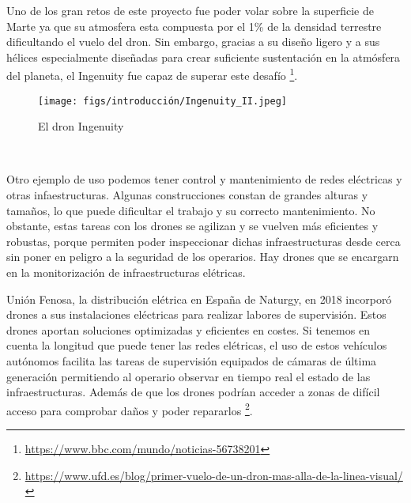 Uno de los gran retos de este proyecto fue poder volar sobre la superficie de Marte ya que su atmosfera esta compuesta por el 1\% de la densidad terrestre
dificultando el vuelo del dron. Sin embargo, gracias a su diseño ligero y a sus hélices especialmente diseñadas para crear suficiente sustentación en la atmósfera del planeta, el Ingenuity 
fue capaz de superar este desafío \footnote{\url{https://www.bbc.com/mundo/noticias-56738201}}. \newline
\begin{figure} [H]
  \begin{center}
    \texttt{[image: figs/introducción/Ingenuity\_II.jpeg]}
  \end{center}
  \caption{El dron Ingenuity}
  \label{fig:Ingenuity}
\end{figure}\

Otro ejemplo de uso podemos tener control y mantenimiento de redes eléctricas y otras infaestructuras. Algunas construcciones constan de grandes alturas y tamaños, lo que puede
dificultar el trabajo y su correcto mantenimiento. No obstante, estas tareas con los drones se agilizan y se vuelven más eficientes y robustas, porque permiten poder
inspeccionar dichas infraestructuras desde cerca sin poner en peligro a la seguridad de los operarios. 
Hay drones que se encargarn en la monitorización de infraestructuras elétricas. \newline

Unión Fenosa, la distribución elétrica en España de Naturgy, en 2018 incorporó drones a sus instalaciones eléctricas para realizar labores de supervisión. Estos drones aportan 
soluciones optimizadas y eficientes en costes. Si tenemos en cuenta la longitud que puede tener las redes elétricas, el uso de estos vehículos
autónomos facilita las tareas de supervisión equipados de cámaras de última generación permitiendo al operario observar en tiempo real el estado de las infraestructuras. Además de que los
drones podrían acceder a zonas de difícil acceso para comprobar daños y poder repararlos \footnote{\url{https://www.ufd.es/blog/primer-vuelo-de-un-dron-mas-alla-de-la-linea-visual/}}. \newline 


